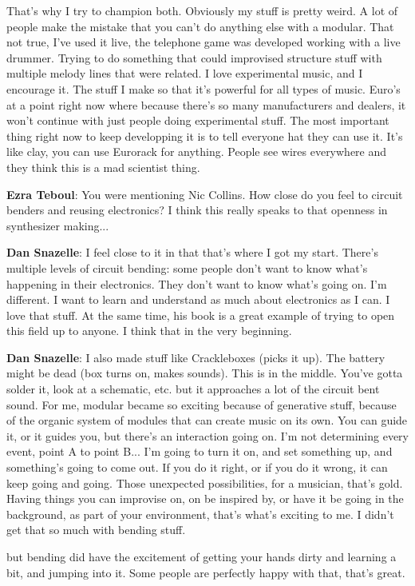 That's why I try to champion both. Obviously my stuff is pretty weird. A lot of people make the mistake that you can't do anything else with a modular. That not true, I've used it live, the telephone game was developed working with a live drummer. Trying to do something that could improvised structure stuff with multiple melody lines that were related. I love experimental music, and I encourage it. The stuff I make so that it's powerful for all types of music. Euro's at a point right now where because there's so many manufacturers and dealers, it won't continue with just people doing experimental stuff. The most important thing right now to keep developping it is to tell everyone hat they can use it. It's like clay, you can use Eurorack for anything. People see wires everywhere and they think this is a mad scientist thing.

\textbf{Ezra Teboul}: You were mentioning Nic Collins. How close do you feel to circuit benders and reusing electronics? I think this really speaks to that openness in synthesizer making...

\textbf{Dan Snazelle}: I feel close to it in that that's where I got my start. There's multiple levels of circuit bending: some people don't want to know what's happening in their electronics. They don't want to know what's going on. I'm different. I want to learn and understand as much about electronics as I can. I love that stuff. At the same time, his book is a great example of trying to open this field up to anyone. I think that in the very beginning.  

\textbf{Dan Snazelle}: I also made stuff like Crackleboxes (picks it up). The battery might be dead (box turns on, makes sounds). This is in the middle. You've gotta solder it, look at a schematic, etc. but it approaches a lot of the circuit bent sound. For me, modular became so exciting because of generative stuff, because of the organic system of modules that can create music on its own. You can guide it, or it guides you, but there's an interaction going on. I'm not determining every event, point A to point B... I'm going to turn it on, and set something up, and something's going to come out. If you do it right, or if you do it wrong, it can keep going and going. Those unexpected possibilities, for a musician, that's gold. Having things you can improvise on, on be inspired by, or have it be going in the background, as part of your environment, that's what's exciting to me. I didn't get that so much with bending stuff. 

but bending did have the excitement of getting your hands dirty and learning a bit, and jumping into it. Some people are perfectly happy with that, that's great. 

